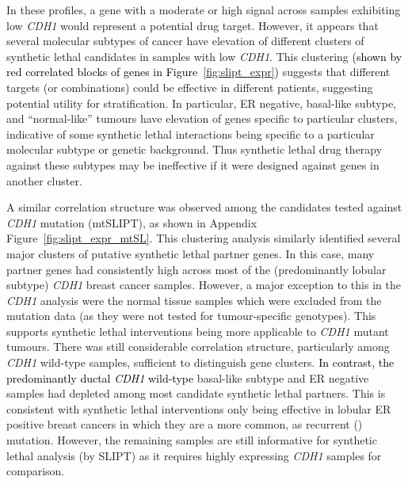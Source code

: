 In these  profiles, a gene with a moderate or high signal across samples exhibiting low \textit{CDH1}  would represent a potential drug target. However, it appears that several molecular subtypes of cancer have elevation of different clusters of \gls{synthetic lethal} candidates in samples with low \textit{CDH1}. This clustering \textcolor{black}{(shown by red correlated blocks of genes in Figure~\ref{fig:slipt_expr})} suggests that different targets (or combinations) could be effective in different patients, suggesting potential utility for stratification.  In particular, \gls{ER} negative, basal-like subtype, and ``normal-like'' tumours \citep{Eroles2012, Parker2009, Dai2015} have elevation of genes specific to particular clusters, indicative of some \gls{synthetic lethal} interactions being specific to a particular molecular subtype or genetic background. Thus \gls{synthetic lethal} drug therapy against these subtypes may be ineffective if it were designed against genes in another cluster.
 
A similar correlation structure was observed among the candidates tested against \textit{CDH1} \gls{mutation} (\acrshort{mtSLIPT}), as shown in Appendix Figure~\ref{fig:slipt_expr_mtSL}. This clustering analysis similarly identified several major clusters of putative \gls{synthetic lethal} partner genes. In this case, many partner genes had consistently high  across most of the (predominantly lobular subtype) \textit{CDH1} breast cancer samples. However, a major exception to this in the \textit{CDH1}  analysis were the normal tissue samples which were excluded from the \gls{mutation} data (as they were not tested for tumour-specific genotypes). This supports \gls{synthetic lethal} interventions being more applicable to \textit{CDH1} \gls{mutant} tumours. There was still considerable correlation structure, particularly among \textit{CDH1} \gls{wild-type} samples, sufficient to distinguish gene clusters. \textcolor{black}{In contrast, the predominantly ductal \textit{CDH1} \gls{wild-type}} basal-like subtype and \gls{ER} negative samples had depleted  among most candidate \gls{synthetic lethal} partners. This is consistent with \gls{synthetic lethal} interventions only being effective in lobular \gls{ER} positive breast cancers in which they are a more common, as recurrent () \gls{mutation}. However, the remaining samples are still informative for \gls{synthetic lethal} analysis (by \gls{SLIPT}) as it requires highly expressing \textit{CDH1} samples for comparison.

